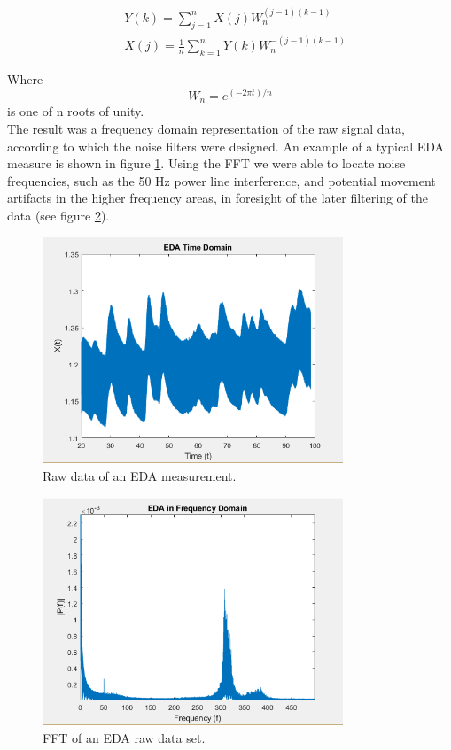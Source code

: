 \begin{align}\label{fft1}
& Y(k) = \sum\limits_{j=1}^n X(j) W_{n}^{(j-1)(k-1)} \\
& X(j) = \frac{1}{n} \sum\limits_{k=1}^n Y(k) W_{n}^{-(j-1)(k-1)} 
\end{align} 

Where
\begin{equation}
W_{n} = e^{(-2\pi t)/n}
\end{equation}
is one of n roots of unity.\\

The result was a frequency domain representation of the raw signal data, according to which the noise filters were designed. An example of a typical EDA measure is shown in figure \ref{rawEDAImg}. Using the FFT we were able to locate noise frequencies, such as the 50 Hz power line interference, and potential movement artifacts in the higher frequency areas, in foresight of the later filtering of the data (see figure \ref{fftEDAImg}).\\

\begin{figure}[H]
\centering
\includegraphics[width=0.8\textwidth]{images/rawEDA.png}
\caption{Raw data of an EDA measurement.}
\label{rawEDAImg}
\end{figure}

\begin{figure}[H]
\centering
\includegraphics[width=0.8\textwidth]{images/fftEDA.png}
\caption{FFT of an EDA raw data set.}
\label{fftEDAImg}
\end{figure}

